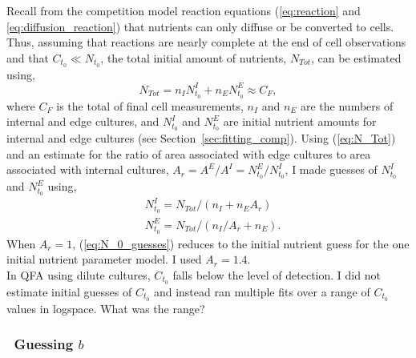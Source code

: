 Recall from the competition model reaction equations
(\ref{eq:reaction} and \ref{eq:diffusion_reaction}) that nutrients can
only diffuse or be converted to cells. Thus, assuming that reactions
are nearly complete at the end of cell observations and that
\(C_{t_{0}} \ll N_{t_{0}}\), the total initial amount of nutrients,
\(N_{Tot}\), can be estimated using,
\begin{equation}
  \label{eq:N_Tot}
  N_{Tot} = n_{I}N^{I}_{t_{0}} + n_{E}N^{E}_{t_{0}} \approx C_{F},
\end{equation}
where \(C_{F}\) is the total of final cell measurements, \(n_{I}\) and
\(n_{E}\) are the numbers of internal and edge cultures, and
\(N^{I}_{t_{0}}\) and \(N^{E}_{t_{0}}\) are initial nutrient amounts
for internal and edge cultures (see
Section~\ref{sec:fitting_comp}). Using (\ref{eq:N_Tot}) and an estimate
for the ratio of area associated with edge cultures to area associated
with internal cultures,
\(A_{r} = A^{E} / A^{I} = N^{E}_{t_{0}} / N^{I}_{t_{0}}\), I made
guesses of \(N^{I}_{t_{0}}\) and \(N^{E}_{t_{0}}\) using,
%
\begin{equation}
  \label{eq:N_0_guesses}
  \begin{aligned}
    &N^{I}_{t_{0}} = N_{Tot} / (n_{I} + n_{E}A_{r})\\
    &N^{E}_{t_{0}} = N_{Tot} / (n_{I}/A_{r} + n_{E}).
  \end{aligned}
\end{equation}
%
When \(A_{r} = 1\), (\ref{eq:N_0_guesses}) reduces to the initial
nutrient guess for the one initial nutrient parameter model. I used
\(A_{r} = 1.4\).
\\
In QFA using dilute cultures, \(C_{t_{0}}\) falls below the level of
detection.  I did not estimate initial guesses of \(C_{t_{0}}\) and
instead ran multiple fits over a range of \(C_{t_{0}}\) values in
logspace. What was the range?

\subsubsection{\boldmath \thesubsubsection~Guessing  \(b\) \unboldmath}

